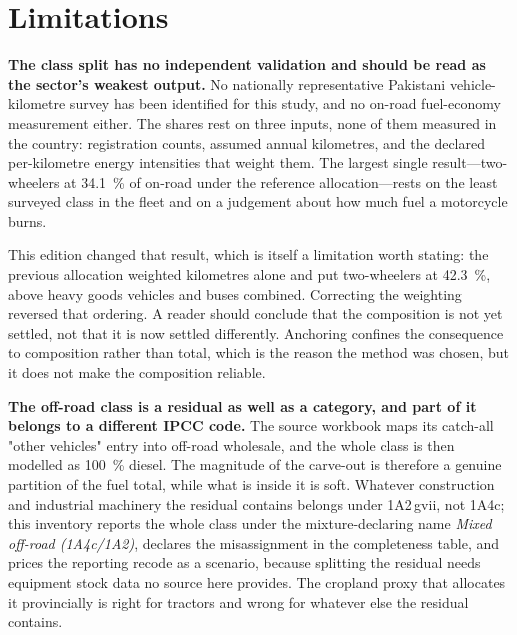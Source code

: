 \section{Limitations}
\label{sec:limitations}

\textbf{The class split has no independent validation and should be read as the sector's
weakest output.} No nationally representative Pakistani vehicle-kilometre survey has been
identified for this study, and no on-road fuel-economy measurement either. The shares rest
on three inputs, none of them measured in the country: registration counts, assumed annual
kilometres, and the declared per-kilometre energy intensities that weight them. The largest
single result---two-wheelers at \SI{34.1}{\percent} of on-road \COtwo{} under the
reference allocation---rests on the least surveyed class in the fleet and on a judgement about how
much fuel a motorcycle burns.

This edition changed that result, which is itself a limitation worth stating: the previous
allocation weighted kilometres alone and put two-wheelers at \SI{42.3}{\percent}, above
heavy goods vehicles and buses combined. Correcting the weighting reversed that ordering.
A reader should conclude that the composition is not yet settled, not that it is now
settled differently. Anchoring confines the consequence to composition rather than total,
which is the reason the method was chosen, but it does not make the composition reliable.

\textbf{The off-road class is a residual as well as a category, and part of it belongs to a
different IPCC code.} The source workbook maps its catch-all "other vehicles" entry into
off-road wholesale, and the whole class is then modelled as \SI{100}{\percent} diesel. The
magnitude of the carve-out is therefore a genuine partition of the fuel total, while what
is inside it is soft. Whatever construction and industrial machinery the residual contains
belongs under 1A2\,gvii, not 1A4c; this inventory reports the whole class under the
mixture-declaring name \emph{Mixed off-road (1A4c/1A2)}, declares the misassignment in the
completeness table, and prices the reporting recode as a scenario, because splitting the
residual needs equipment stock data no source here provides. The cropland proxy that
allocates it provincially is right for tractors and wrong for whatever else the residual
contains.

